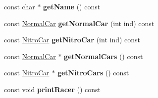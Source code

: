 \begin{DoxyCompactItemize}
\item 
const char $\ast$ {\bfseries get\+Name} () const \hypertarget{classRacer_a0cfe72ecb9e5ae263fc21d5af543141d}{}\label{classRacer_a0cfe72ecb9e5ae263fc21d5af543141d}

\item 
const \hyperlink{classNormalCar}{Normal\+Car} {\bfseries get\+Normal\+Car} (int ind) const \hypertarget{classRacer_a2d4f8edcb997ce2ef368d96a1e0e4ee8}{}\label{classRacer_a2d4f8edcb997ce2ef368d96a1e0e4ee8}

\item 
const \hyperlink{classNitroCar}{Nitro\+Car} {\bfseries get\+Nitro\+Car} (int ind) const \hypertarget{classRacer_aa1030785502c3fa65a130a59222e6aac}{}\label{classRacer_aa1030785502c3fa65a130a59222e6aac}

\item 
const \hyperlink{classNormalCar}{Normal\+Car} $\ast$ {\bfseries get\+Normal\+Cars} () const \hypertarget{classRacer_af99a1794db99fb1ce89bc7bf539b9d9b}{}\label{classRacer_af99a1794db99fb1ce89bc7bf539b9d9b}

\item 
const \hyperlink{classNitroCar}{Nitro\+Car} $\ast$ {\bfseries get\+Nitro\+Cars} () const \hypertarget{classRacer_aa914de20a181d90a42151350b7a63716}{}\label{classRacer_aa914de20a181d90a42151350b7a63716}

\item 
const void {\bfseries print\+Racer} () const \hypertarget{classRacer_a6f9ba60bdb2e2aee1bcf3e66017c6034}{}\label{classRacer_a6f9ba60bdb2e2aee1bcf3e66017c6034}

\end{DoxyCompactItemize}
